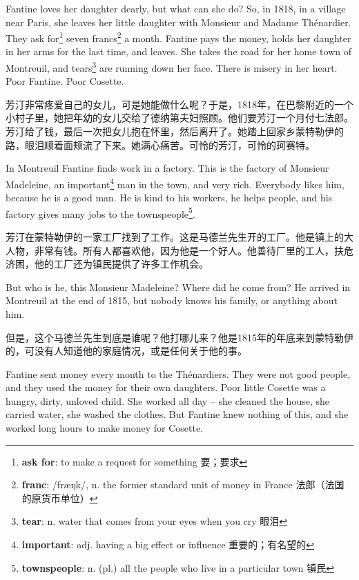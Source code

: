 \documentclass[fontset=ubuntu, zihao=5]{ctexart}
\newcommand\doulos[1]{{\fontspec{Doulos SIL} /#1/}}
\begin{document}
\begin{paracol}{2}
\switchcolumn*

Fantine loves her daughter dearly, but what can she do? So, in 1818, in a
village near Paris, she leaves her little daughter with Monsieur and Madame
Thénardier. They ask for\footnote{\textbf{ask for}: to make a request for something 要；要求} seven francs\footnote{\textbf{franc}:
  \doulos{fræŋk}, n. the former standard unit of money in France 法郎（法国
  的原货币单位）} a month. Fantine pays the money, holds her daughter in her
arms for the last time, and leaves. She takes the road for her home town of
Montreuil, and tears\footnote{\textbf{tear}: n. water that comes from your eyes when you cry 眼泪} are running down her face. There is misery in her
heart. Poor Fantine. Poor Cosette.

\switchcolumn

芳汀非常疼爱自己的女儿，可是她能做什么呢？于是，1818年，在巴黎附近的一个小村子里，她把年幼的女儿交给了德纳第夫妇照顾。他们要芳汀一个月付七法郎。芳汀给了钱，最后一次把女儿抱在怀里，然后离开了。她踏上回家乡蒙特勒伊的路，眼泪顺着面颊流了下来。她满心痛苦。可怜的芳汀，可怜的珂赛特。

\switchcolumn*

In Montreuil Fantine finds work in a factory. This is the factory of
Monsieur Madeleine, an important\footnote{\textbf{important}: adj. having a
  big effect or influence 重要的；有名望的} man in the town, and very rich.
Everybody likes him, because he is a good man. He is kind to his workers, he
helps people, and his factory gives many jobs to the
townspeople\footnote{\textbf{townspeople}: n. (pl.) all the people who live
  in a particular town 镇民}.

\switchcolumn

芳汀在蒙特勒伊的一家工厂找到了工作。这是马德兰先生开的工厂。他是镇上的大人物，非常有钱。所有人都喜欢他，因为他是一个好人。他善待厂里的工人，扶危济困，他的工厂还为镇民提供了许多工作机会。

\switchcolumn*

But who is he, this Monsieur Madeleine? Where did he come from? He arrived in Montreuil at the end of 1815, but nobody knows his family, or anything about him.

\switchcolumn

但是，这个马德兰先生到底是谁呢？他打哪儿来？他是1815年的年底来到蒙特勒伊的，可没有人知道他的家庭情况，或是任何关于他的事。



\switchcolumn*

Fantine sent money every month to the Thénardiers. They were not good people, and they used the money for their own daughters. Poor little Cosette was a hungry, dirty, unloved child. She worked all day – she cleaned the house, she carried water, she washed the clothes. But Fantine knew nothing of this, and she worked long hours to make money for Cosette.


\end{paracol}
\end{document}
